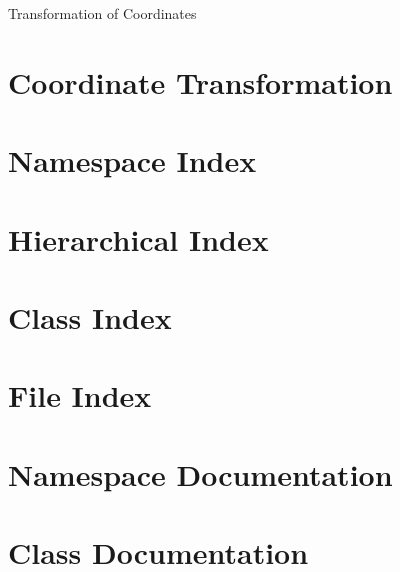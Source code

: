 Transformation of Coordinates
\chapter{Coordinate Transformation}
\label{index}\hypertarget{index}{}
\chapter{Namespace Index}

\chapter{Hierarchical Index}

\chapter{Class Index}

\chapter{File Index}

\chapter{Namespace Documentation}








\chapter{Class Documentation}





























